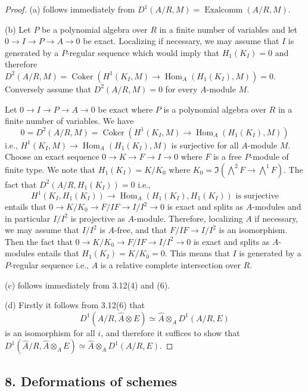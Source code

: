 \documentclass[11pt]{article}
\theoremstyle{plain}
\theoremstyle{definition}
\theoremstyle{remark}
\DeclareMathOperator{\Hom}{Hom}
\DeclareMathOperator{\Exalcomm}{Exalcomm}
\DeclareMathOperator{\Coker}{Coker}
\begin{document}
\begin{proof}
(a) follows immediately from $D^1(A/R, M) = \Exalcomm(A/R, M)$.

(b) Let $P$ be a polynomial algebra over $R$ in a finite number of variables and let $0 \to I \to P \to A \to 0$ be exact. Localizing if necessary, we may assume that $I$ is generated by a $P$-regular sequence which would imply that $H_1(K_I) = 0$ and therefore $D^2(A/R, M) = \Coker(H^1(K_I, M) \to \Hom_A(H_1(K_I), M)) = 0$. Conversely assume that $D^2(A/R, M) = 0$ for every $A$-module $M$.

Let $0 \to I \to P \to A \to 0$ be exact where $P$ is a polynomial algebra over $R$ in a finite number of variables. We have
\[
0 = D^2(A/R, M) = \Coker(H^1(K_I, M) \to \Hom_A(H_1(K_I), M))
\]
i.e., $H^1(K_I, M) \to \Hom_A(H_1(K_I), M)$ is surjective for all $A$-module $M$. Choose an exact sequence $0 \to K \to F \to I \to 0$ where $F$ is a free $P$-module of finite type. We note that $H_1(K_I) = K/K_0$ where $K_0 = \Im(\bigwedge^2 F \to \bigwedge^1 F)$. The fact that $D^2(A/R, H_1(K_I)) = 0$ i.e.,
\[
H^1(K_I, H_1(K_I)) \to \Hom_A(H_1(K_I), H_1(K_I)) \text{ is surjective}
\]
entails that $0 \to K/K_0 \to F/IF \to I/I^2 \to 0$ is exact and splits as $A$-modules and in particular $I/I^2$ is projective as $A$-module. Therefore, localizing $A$ if necessary, we may assume that $I/I^2$ is $A$-free, and that $F/IF \to I/I^2$ is an isomorphism. Then the fact that $0 \to K/K_0 \to F/IF \to I/I^2 \to 0$ is exact and splits as $A$-modules entails that $H_1(K_I) = K/K_0 = 0$. This means that $I$ is generated by a $P$-regular sequence i.e., $A$ is a relative complete intersection over $R$.

(c) follows immediately from 3.12(4) and (6).

(d) Firstly it follows from 3.12(6) that
\[
D^1(A/R, \widehat{A} \otimes E) \simeq \widehat{A} \otimes_A D^1(A/R, E)
\]
is an isomorphism for all $i$, and therefore it suffices to show that $D^1(\widehat{A}/R, \widehat{A} \otimes_A E) \simeq \widehat{A} \otimes_A D^1(A/R, E)$.
\end{proof}

\subsection*{8. Deformations of schemes}
\end{document}

